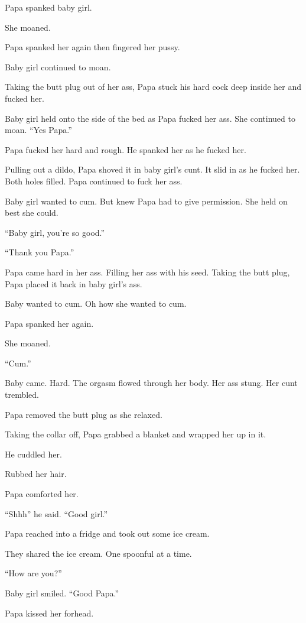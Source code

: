      Papa spanked baby girl.

     She moaned.

     Papa spanked her again then fingered her pussy.

     Baby girl continued to moan.

     Taking the butt plug out of her ass, Papa stuck his hard cock deep inside her and fucked her.

     Baby girl held onto the side of the bed as Papa fucked her ass. She continued to moan. “Yes Papa.”

     Papa fucked her hard and rough. He spanked her as he fucked her.

     Pulling out a dildo, Papa shoved it in baby girl’s cunt. It slid in as he fucked her. Both holes filled. Papa continued to fuck her ass.

     Baby girl wanted to cum. But knew Papa had to give permission. She held on best she could.

     “Baby girl, you’re so good.”

     “Thank you Papa.”

     Papa came hard in her ass. Filling her ass with his seed. Taking the butt plug, Papa placed it back in baby girl’s ass.

     Baby wanted to cum. Oh how she wanted to cum.

     Papa spanked her again.

     She moaned.

     “Cum.”

     Baby came. Hard. The orgasm flowed through her body. Her ass stung. Her cunt trembled.

     Papa removed the butt plug as she relaxed.

     Taking the collar off, Papa grabbed a blanket and wrapped her up in it.

     He cuddled her.

     Rubbed her hair.

     Papa comforted her.

     “Shhh” he said. “Good girl.”

     Papa reached into a fridge and took out some ice cream.

     They shared the ice cream. One spoonful at a time.

     “How are you?”

    Baby girl smiled. “Good Papa.”

    Papa kissed her forhead.


